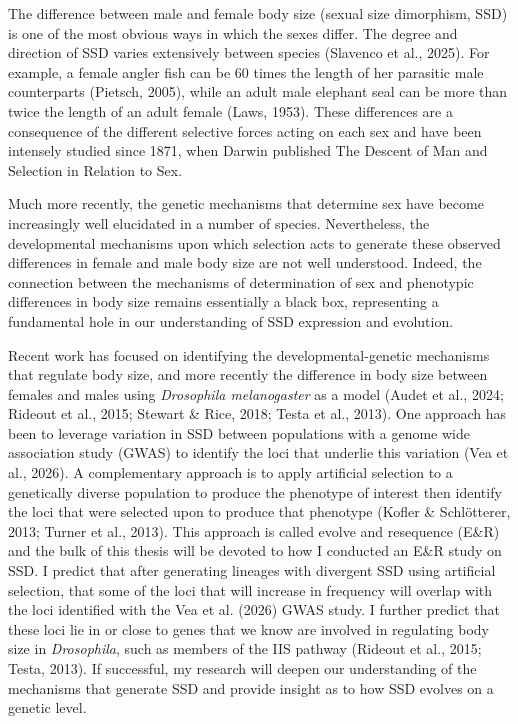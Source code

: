 \documentclass[12pt,reqno,oneside]{report}
\begin{document}
\setlength{\parindent}{24pt} 

The difference between male and female body size (sexual size dimorphism, SSD) is one of the most obvious ways in which the sexes differ. The degree and direction of SSD varies extensively between species (Slavenco et al., 2025). For example, a female angler fish can be 60 times the length of her parasitic male counterparts (Pietsch, 2005), while an adult male elephant seal can be more than twice the length of an adult female (Laws, 1953). These differences are a consequence of the different selective forces acting on each sex and have been intensely studied since 1871, when Darwin published The Descent of Man and Selection in Relation to Sex. 

Much more recently, the genetic mechanisms that determine sex have become increasingly well elucidated in a number of species. Nevertheless, the developmental mechanisms upon which selection acts to generate these observed differences in female and male body size are not well understood. Indeed, the connection between the mechanisms of determination of sex and phenotypic differences in body size remains essentially a black box, representing a fundamental hole in our understanding of SSD expression and evolution.

Recent work has focused on identifying the developmental-genetic mechanisms that regulate body size, and more recently the difference in body size between females and males using \textit{Drosophila melanogaster} as a model (Audet et al., 2024; Rideout et al., 2015; Stewart \& Rice, 2018; Testa et al., 2013). One approach has been to leverage variation in SSD between populations with a genome wide association study (GWAS) to identify the loci that underlie this variation (Vea et al., 2026). A complementary approach is to apply artificial selection to a genetically diverse population to produce the phenotype of interest then identify the loci that were selected upon to produce that phenotype (Kofler \& Schlötterer, 2013; Turner et al., 2013). This approach is called evolve and resequence (E\&R) and the bulk of this thesis will be devoted to how I conducted an E\&R study on SSD. I predict that after generating lineages with divergent SSD using artificial selection, that some of the loci that will increase in frequency will overlap with the loci identified with the Vea et al. (2026) GWAS study. I further predict that these loci lie in or close to genes that we know are involved in regulating body size in \textit{Drosophila}, such as members of the IIS pathway (Rideout et al., 2015; Testa, 2013). If successful, my research will deepen our understanding of the mechanisms that generate SSD and provide insight as to how SSD evolves on a genetic level.
\end{document}
